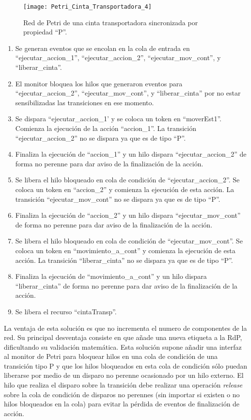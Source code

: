 \begin{figure}[H]
    \centering
    \texttt{[image: Petri\_Cinta\_Transportadora\_4]}
    \caption{Red de Petri de una cinta transportadora sincronizada por
    propiedad ``P''.}
    \label{fig:petri_cinta_transportadora_4}
\end{figure}

\begin{enumerate}
    \item Se generan eventos que se encolan en la cola de entrada en
    ``ejecutar\_accion\_1'', ``ejecutar\_accion\_2'', ``ejecutar\_mov\_cont'',
    y ``liberar\_cinta''.
	\item El monitor bloquea los hilos que generaron eventos para
	``ejecutar\_accion\_2'', ``ejecutar\_mov\_cont'', y ``liberar\_cinta'' por
	no estar sensibilizadas las transiciones en ese momento.
	\item Se dispara ``ejecutar\_accion\_1' y se coloca un token en ``moverEst1''.
	Comienza la ejecución de la acción ``accion\_1''. La transición
	``ejecutar\_accion\_2'' no se dispara ya que es de tipo ``P''.
	\item Finaliza la ejecución de ``accion\_1'' y un hilo dispara 
	``ejecutar\_accion\_2'' de forma no perenne para dar aviso de la finalización
	de la acción.
	\item Se libera el hilo bloqueado en cola de condición de
	``ejecutar\_accion\_2''. Se coloca un token en ``accion\_2'' y comienza la
	ejecución de esta acción. La transición ``ejecutar\_mov\_cont'' no se dispara
	ya que es de tipo ``P''.
	\item Finaliza la ejecución de ``accion\_2'' y un hilo dispara
	``ejecutar\_mov\_cont'' de forma no perenne para dar aviso de la finalización
	de la acción.
	\item  Se libera el hilo bloqueado en cola de condición de
	``ejecutar\_mov\_cont''. Se coloca un token en ``movimiento\_a\_cont'' y
	comienza la ejecución de esta acción. La transición ``liberar\_cinta'' no se dispara ya
	que es de tipo ``P''.
	\item Finaliza la ejecución de ``movimiento\_a\_cont'' y un hilo dispara
	``liberar\_cinta'' de forma no perenne para dar aviso de la finalización de la
	acción.
	\item Se libera el recurso ``cintaTransp''.
\end{enumerate}

La ventaja de esta solución es que no incrementa el numero de componentes de la
red. Su principal desventaja consiste en que añade una nueva etiqueta a la
RdP, dificultando su validación matemática. Esta solución supone añadir
una interfaz al monitor de Petri para bloquear hilos en una cola de condición de
una transición tipo P y que los hilos bloqueados en esta cola de condición sólo
puedan liberarse por medio de un disparo no perenne ocasionado por un hilo
externo.
El hilo que realiza el disparo sobre la transición debe realizar una operación
\emph{release} sobre la cola de condición de disparos no perennes (sin importar
si existen o no hilos bloqueados en la cola) para evitar la pérdida de eventos de
finalización de acción.

